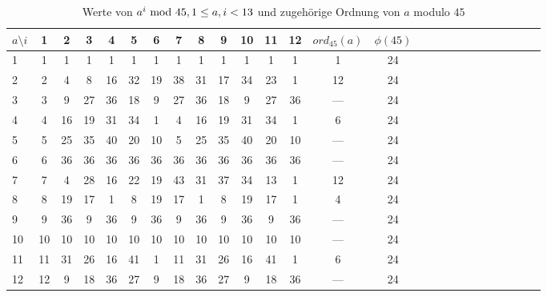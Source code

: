 \begin{refsegment}
\begin{table}[ht]
\begin{center} \label{SrcArith3b}
\begin{tabular}{|l||c|c|c|c|c|c|c|c|c|c|c|c|c|c|c|c|c|c|c|c|c|c|c|c|c|}
\hline
 $a\setminus i$ & 1            & 2            & 3 & 4 & 5 & 6 & 7 & 8 & 9 & 10 & 11 & 12     & $ord_{45}(a)$       & $\phi(45)$\\
\hline
\hline
1             & 1              & 1   & 1   & 1   & 1   & 1   & 1   & 1   & 1    & 1    & 1    & 1 & 1              & 24\\
\hline
2             & 2              & 4   & 8  & 16  & 32  & 19  & 38  & 31  & 17   & 34   & 23    & 1 & 12             & 24\\
\hline
3             & 3              & 9  & 27  & 36  & 18   & 9  & 27  & 36  & 18    & 9   & 27   & 36  & ---            & 24\\
\hline
4             & 4             & 16  & 19  & 31  & 34   & 1   & 4  & 16  & 19   & 31   & 34    & 1  & 6              & 24\\
\hline
5             & 5             & 25  & 35  & 40  & 20  & 10   & 5  & 25  & 35   & 40   & 20   & 10  & ---            & 24\\
\hline
6             & 6             & 36  & 36  & 36  & 36  & 36  & 36  & 36  & 36   & 36   & 36   & 36  & ---            & 24\\
\hline
7             & 7              & 4  & 28  & 16  & 22  & 19  & 43  & 31  & 37   & 34   & 13    & 1  & 12             & 24\\
\hline
8             & 8             & 19  & 17   & 1   & 8  & 19  & 17   & 1   & 8   & 19   & 17    & 1  & 4              & 24\\
\hline
9             & 9             & 36   & 9  & 36   & 9  & 36   & 9  & 36   & 9   & 36    & 9   & 36  & ---            & 24\\
\hline
10           & 10             & 10  & 10  & 10  & 10  & 10  & 10  & 10  & 10   & 10   & 10   & 10  & ---            & 24\\
\hline
11           & 11             & 31  & 26  & 16  & 41   & 1  & 11  & 31  & 26   & 16   & 41    & 1  & 6              & 24\\
\hline
12           & 12              & 9  & 18  & 36  & 27   & 9  & 18  & 36  & 27    & 9   & 18   & 36  & ---            & 24\\
\hline
\end{tabular}
\end{center}
\caption{Werte von $a^i{\rm ~mod~}45, 1\leq a,i<13$ und zugehörige Ordnung von $a$ modulo $45$}
\label{expmod45}
\end{table}


\end{refsegment}
